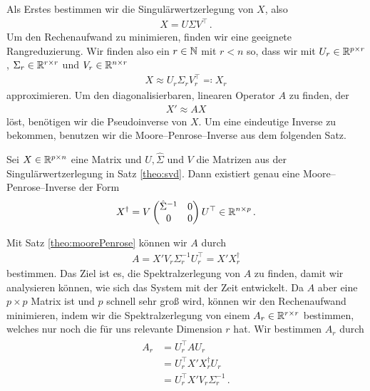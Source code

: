 \documentclass[../Bachelor_LennartKoliwer.tex]{subfiles}
\begin{document}
Als Erstes bestimmen wir die Singulärwertzerlegung von $X$, also
\begin{align*}
	X=U\Sigma V^\top\,.
\end{align*}
Um den Rechenaufwand zu minimieren, finden wir eine geeignete Rangreduzierung.
Wir finden also ein $r\in\mathbb{N}$ mit $r<n$ so, dass wir mit $U_r\in\mathbb{R}^{p\times r}$, $\Sigma_r\in\mathbb{R}^{r\times r}$ und $V_r\in\mathbb{R}^{n\times r}$
\begin{align*}
	X\approx U_r\Sigma_rV_r^\top \eqqcolon X_r
\end{align*}
approximieren.
Um den diagonalisierbaren, linearen Operator $A$ zu finden, der 
\begin{align*}
	X'\approx AX
\end{align*}
löst, benötigen wir die Pseudoinverse von $X$. Um eine eindeutige Inverse zu bekommen, benutzen wir die Moore--Penrose--Inverse aus dem folgenden Satz.
\begin{theorem} \label{theo:moorePenrose}
	Sei $X\in\mathbb{R}^{p\times n}$ eine Matrix und $U, \hat{\Sigma}$ und $V$ die Matrizen aus der Singulärwertzerlegung in Satz \ref{theo:svd}. Dann existiert genau eine Moore--Penrose--Inverse der Form
	\begin{align*}
		X^\dag=V\begin{pmatrix}
			        \hat{\Sigma}^{-1} & 0 \\
			        0                 & 0
		        \end{pmatrix}U^\top \in\mathbb{R}^{n\times p}\,.
	\end{align*}
\end{theorem}
Mit Satz \ref{theo:moorePenrose} können wir $A$ durch  
\begin{align*}
	A = X'V_r \Sigma_r^{-1} U_r^\top = X'X_r^\dagger
\end{align*}
bestimmen.
Das Ziel ist es, die Spektralzerlegung von $A$ zu finden, damit wir analysieren können, wie sich das System mit der Zeit entwickelt.
Da $A$ aber eine $p\times p$ Matrix ist und $p$ schnell sehr groß wird, können wir den Rechenaufwand minimieren, indem wir die Spektralzerlegung von einem $A_r\in\mathbb{R}^{r\times r}$ bestimmen, welches nur noch die für uns relevante Dimension $r$ hat.
Wir bestimmen $A_r$ durch
\begin{align}
	\begin{split}\label{eq:A_r}
	A_r&=U_r^\top A U_r \\
	 &= U_r^\top X'X^\dagger_r U_r \\
	 &= U_r^\top X'V_r\Sigma_r^{-1}\,.
	\end{split}
\end{align}
\end{document}
